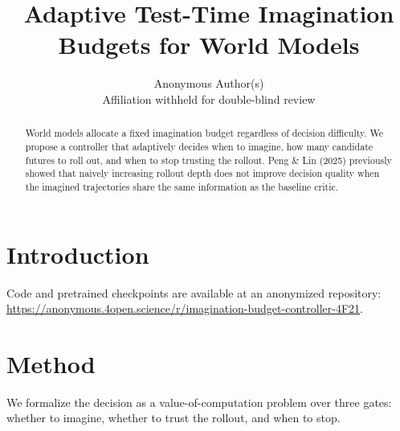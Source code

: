 \documentclass{article}
\title{Adaptive Test-Time Imagination Budgets for World Models}
\author{Anonymous Author(s) \\ Affiliation withheld for double-blind review}
\begin{document}
\maketitle

\begin{abstract}
World models allocate a fixed imagination budget regardless of decision difficulty.
We propose a controller that adaptively decides when to imagine, how many candidate
futures to roll out, and when to stop trusting the rollout. Peng \& Lin (2025)
previously showed that naively increasing rollout depth does not improve decision
quality when the imagined trajectories share the same information as the baseline
critic.
\end{abstract}

\section{Introduction}
Code and pretrained checkpoints are available at an anonymized repository:
\url{https://anonymous.4open.science/r/imagination-budget-controller-4F21}.

\section{Method}
We formalize the decision as a value-of-computation problem over three gates:
whether to imagine, whether to trust the rollout, and when to stop.
\end{document}
